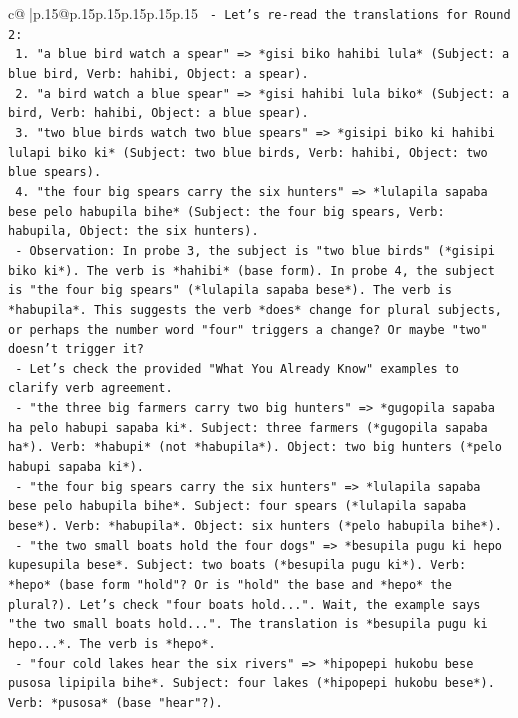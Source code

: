 \documentclass{article}
\begin{document}
{\begin{supertabular}{c@{$\;$}|p{.15\linewidth}@{}p{.15\linewidth}p{.15\linewidth}p{.15\linewidth}p{.15\linewidth}p{.15\linewidth}}
{{{\texttt{   {-} Let's re{-}read the translations for Round 2:} \\
\texttt{     1. "a blue bird watch a spear" => *gisi biko hahibi lula* (Subject: a blue bird, Verb: hahibi, Object: a spear).} \\
\texttt{     2. "a bird watch a blue spear" => *gisi hahibi lula biko* (Subject: a bird, Verb: hahibi, Object: a blue spear).} \\
\texttt{     3. "two blue birds watch two blue spears" => *gisipi biko ki hahibi lulapi biko ki* (Subject: two blue birds, Verb: hahibi, Object: two blue spears).} \\
\texttt{     4. "the four big spears carry the six hunters" => *lulapila sapaba bese pelo habupila bihe* (Subject: the four big spears, Verb: habupila, Object: the six hunters).} \\
\texttt{   {-} Observation: In probe 3, the subject is "two blue birds" (*gisipi biko ki*). The verb is *hahibi* (base form). In probe 4, the subject is "the four big spears" (*lulapila sapaba bese*). The verb is *habupila*. This suggests the verb *does* change for plural subjects, or perhaps the number word "four" triggers a change? Or maybe "two" doesn't trigger it?} \\
\texttt{   {-} Let's check the provided "What You Already Know" examples to clarify verb agreement.} \\
\texttt{     {-} "the three big farmers carry two big hunters" => *gugopila sapaba ha pelo habupi sapaba ki*. Subject: three farmers (*gugopila sapaba ha*). Verb: *habupi* (not *habupila*). Object: two big hunters (*pelo habupi sapaba ki*).} \\
\texttt{     {-} "the four big spears carry the six hunters" => *lulapila sapaba bese pelo habupila bihe*. Subject: four spears (*lulapila sapaba bese*). Verb: *habupila*. Object: six hunters (*pelo habupila bihe*).} \\
\texttt{     {-} "the two small boats hold the four dogs" => *besupila pugu ki hepo kupesupila bese*. Subject: two boats (*besupila pugu ki*). Verb: *hepo* (base form "hold"? Or is "hold" the base and *hepo* the plural?). Let's check "four boats hold...". Wait, the example says "the two small boats hold...". The translation is *besupila pugu ki hepo...*. The verb is *hepo*.} \\
\texttt{     {-} "four cold lakes hear the six rivers" => *hipopepi hukobu bese pusosa lipipila bihe*. Subject: four lakes (*hipopepi hukobu bese*). Verb: *pusosa* (base "hear"?).} \\
}}}
\end{supertabular}}
\end{document}
